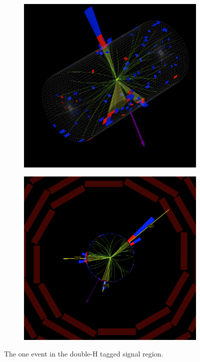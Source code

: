 \begin{figure}
\centering
\begin{subfigure}[b]{0.49\textwidth}
\includegraphics[width=\textwidth]{figs/SUS17006/fireworks_ak8barrel.png}
\end{subfigure}
\begin{subfigure}[b]{0.49\textwidth}
\includegraphics[width=\textwidth]{figs/SUS17006/fireworks_ak8rhophi.png}
\end{subfigure}
\caption{The one event in the double-H tagged signal region.}
\label{fig:fireworks}
\end{figure}

